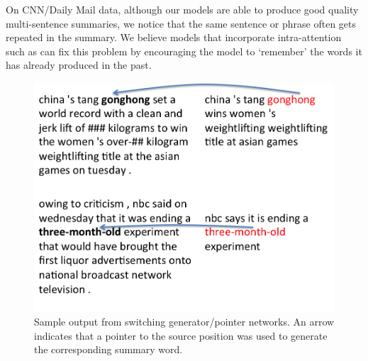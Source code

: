 

On CNN/Daily Mail data, although our models are able to produce good quality multi-sentence summaries, we notice that the same sentence or phrase often gets repeated in the summary. We believe models that incorporate intra-attention such as  can fix this problem by encouraging the model to `remember' the words it has already produced in the past.


\begin{figure} 
	\centering
  \includegraphics[width=.5\textwidth]{example_pointers}
 \vspace{-0.4in}
\caption{{\small Sample output from switching generator/pointer networks. An arrow indicates that a pointer to the source position was used to generate the corresponding summary word.}}
\label{fig:example_pointers}	
\end{figure}

